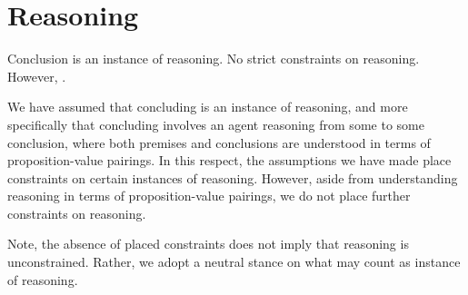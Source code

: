 \section{Reasoning}
\label{sec:reasoning-1}

\begin{note}
  \color{red}
  Conclusion is an instance of reasoning.
  No strict constraints on reasoning.
  However, .
\end{note}

\begin{note}
  We have assumed that concluding is an instance of reasoning, and more specifically that concluding involves an agent reasoning from some \poP{} to some conclusion, where both premises and conclusions are understood in terms of proposition-value pairings.
  In this respect, the assumptions we have made place constraints on certain instances of reasoning.
  However, aside from understanding reasoning in terms of proposition-value pairings, we do not place further constraints on reasoning.

  Note, the absence of placed constraints does not imply that reasoning is unconstrained.
  Rather, we adopt a neutral stance on what may count as instance of reasoning.
\end{note}

